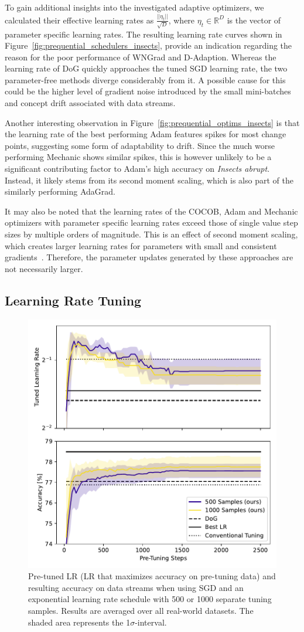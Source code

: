 \documentclass[runningheads]{llncs}
\begin{document}
To gain additional insights into the investigated adaptive optimizers, we calculated their effective learning rates as $\frac{||\eta_t||}{\sqrt{D}}$, where $\eta_t \in \mathbb{R}^D$ is the vector of parameter specific learning rates.
The resulting learning rate curves shown in Figure~\ref{fig:prequential_schedulers_insects}, provide an indication regarding the reason for the poor performance of WNGrad and D-Adaption.
Whereas the learning rate of DoG quickly approaches the tuned SGD learning rate, the two parameter-free methods diverge considerably from it.
A possible cause for this could be the higher level of gradient noise introduced by the small mini-batches and concept drift associated with data streams.

Another interesting observation in Figure~\ref{fig:prequential_optims_insects} is that the learning rate of the best performing Adam features spikes for most change points, suggesting some form of adaptability to drift.
Since the much worse performing Mechanic shows similar spikes, this is however unlikely to be a significant contributing factor to Adam's high accuracy on \textit{Insects abrupt}.
Instead, it likely stems from its second moment scaling, which is also part of the similarly performing AdaGrad.

It may also be noted that the learning rates of the COCOB, Adam and Mechanic optimizers with parameter specific learning rates exceed those of single value step sizes by multiple orders of magnitude.
This is an effect of second moment scaling, which creates larger learning rates for parameters with small and consistent gradients~\cite{cutkoskyMechanicLearningRate2023}.
Therefore, the parameter updates generated by these approaches are not necessarily larger.

\subsection{Learning Rate Tuning}

\begin{figure}[ht]
	\centering
	\includegraphics[width=.45\textwidth]{figures/pretune_1x64_acc_lr_exp_schedule.pdf}
	\caption{Pre-tuned LR (LR that maximizes accuracy on pre-tuning data) and resulting accuracy on data streams when using SGD and an exponential learning rate schedule with 500 or 1000 separate tuning samples. Results are averaged over all real-world datasets. The shaded area represents the 1$\sigma$-interval.}\label{fig:pretune_lr_accuracy}
\end{figure}
\end{document}
